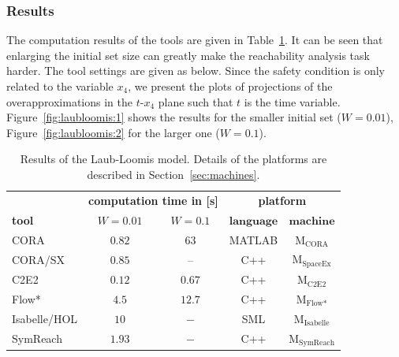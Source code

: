 \documentclass[EPiC]{easychair}
\begin{document}
\subsubsection{Results}

The computation results of the tools are given in Table~\ref{tab:compTimes:laubloomis}. It can be seen that enlarging the initial set size can greatly make the reachability analysis task harder. The tool settings are given as below. Since the safety condition is only related to the variable $x_4$, we present the plots of projections of the overapproximations in the $t$-$x_4$ plane such that $t$ is the time variable. Figure~\ref{fig:laubloomis:1} shows the results for the smaller initial set ($W = 0.01$), Figure~\ref{fig:laubloomis:2} for the larger one ($W = 0.1$). 

\begin{table}[t]
	\setlength{\tabcolsep}{4pt}
	\renewcommand{\arraystretch}{1.2}
	\centering
	\caption{Results of the Laub-Loomis model. Details of the platforms are described in Section~\ref{sec:machines}.}
	\begin{tabular}[c]{lcccc}
	\hline
		 & \multicolumn{2}{c}{\textbf{computation time in [s]}} & \multicolumn{2}{c}{\textbf{platform}} \\ \cmidrule(l){2-3} \cmidrule(l){4-5}
		 \textbf{tool} & \textbf{$W=0.01$} & \textbf{$W=0.1$} & $\textbf{language}$ & $\textbf{machine}$ \\ \hline
         CORA & $0.82$ & $63$ & MATLAB & M$_{\text{CORA}}$ \\
         CORA/SX & $0.85$ & -- & C++ & M$_{\text{SpaceEx}}$ \\
         C2E2 & {$0.12$} & {$0.67$} & {C++} & M$_{\text{C2E2}}$ \\
         Flow* & $4.5$ & $12.7$ & C++ & M$_{\text{Flow*}}$ \\
         Isabelle/HOL & $10$ & $-$ & SML & M$_{\text{Isabelle}}$ \\
         SymReach & $1.93$ & $-$ & C++ & M$_{\text{SymReach}}$ \\
		 \hline
	\end{tabular}
	\label{tab:compTimes:laubloomis}
\end{table}
\end{document}
